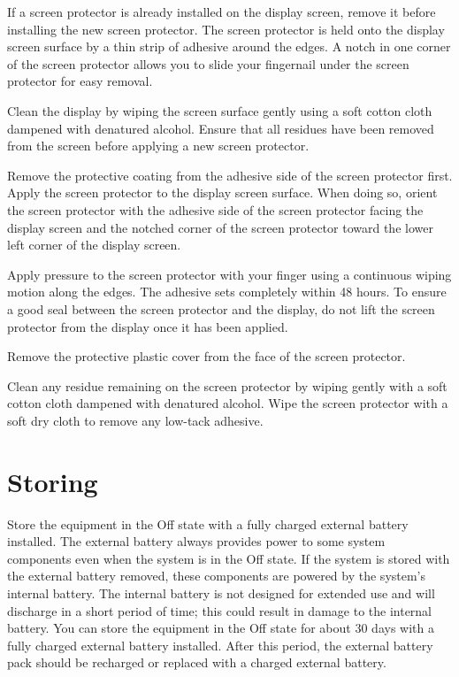 \startitemize[n,packed][stopper=.]
\item
If a screen protector is already installed on the display screen, remove it
before installing the new screen protector. The screen protector is held onto
the display screen surface by a thin strip of adhesive around the edges. A
notch in one corner of the screen protector allows you to slide your
fingernail under the screen protector for easy removal.
\item
Clean the display by wiping the screen surface gently using a soft cotton
cloth dampened with denatured alcohol. Ensure that all residues have been
removed from the screen before applying a new screen protector.
\item
Remove the protective coating from the adhesive side of the screen protector
first. Apply the screen protector to the display screen surface. When doing
so, orient the screen protector with the adhesive side of the screen
protector facing the display screen and the notched corner of the screen
protector toward the lower left corner of the display screen.
\item
Apply pressure to the screen protector with your finger using a continuous
wiping motion along the edges. The adhesive sets completely within 48 hours.
To ensure a good seal between the screen protector and the display, do not
lift the screen protector from the display once it has been applied.
\item
Remove the protective plastic cover from the face of the screen protector.
\item
Clean any residue remaining on the screen protector by wiping gently with a
soft cotton cloth dampened with denatured alcohol. Wipe the screen protector
with a soft dry cloth to remove any low-tack adhesive.
\stopitemize

\section[storing]{Storing}

Store the equipment in the Off state with a fully charged external battery
installed. The external battery always provides power to some system components
even when the system is in the Off state. If the system is stored with the
external battery removed, these components are powered by the system’s internal
battery. The internal battery is not designed for extended use and will
discharge in a short period of time; this could result in damage to the internal
battery. You can store the equipment in the Off state for about 30 days with a
fully charged external battery installed. After this period, the external
battery pack should be recharged or replaced with a charged external battery.

